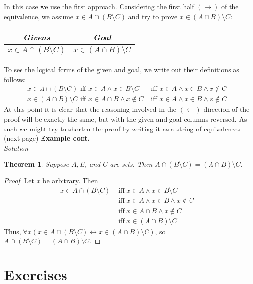 \documentclass{report}
\newtheorem*{theorem}{Theorem}
\theoremstyle{definition}
\begin{document}
In this case we use the first approach. Considering the first half $(\rightarrow)$ of the equivalence, we assume $x\in A\cap(B\setminus C)$
and try to prove $x\in(A\cap B)\setminus C$:
\begin{center}
\begin{tabular}{c|c}
\textit{Givens}&\textit{Goal}\\
\hline
$x\in A\cap(B\setminus C)$&$x\in(A\cap B)\setminus C$\\
\end{tabular}
\end{center}
To see the logical forms of the given and goal, we write out their definitions as follows:
\begin{align*}
x\in A\cap(B\setminus C)\text{ iff }x\in A\land x\in B\setminus C&\text{ iff }x\in A\land x\in B\land x\notin C\\
x\in(A\cap B)\setminus C\text{ iff }x\in A\cap B\land x\notin C&\text{ iff }x\in A\land x\in B\land x\notin C
\end{align*}
At this point it is clear that the reasoning involved in the $(\leftarrow)$ direction of the proof will be exactly the same, but with the given and goal columns reversed. 
As such we might try to shorten the proof by writing it as a string of equivalences.\\
(next page)\newpage
\noindent\textbf{Example cont.}\\
\textit{Solution}
\begin{theorem}
Suppose $A,B$, and $C$ are sets. Then $A\cap(B\setminus C)=(A\cap B)\setminus C$.
\end{theorem}
\begin{proof}
Let $x$ be arbitrary. Then
\begin{align*}
x\in A\cap(B\setminus C)&\text{ iff }x\in A\land x\in B\setminus C\\
&\text{ iff }x\in A\land x\in B\land x\notin C\\
&\text{ iff }x\in A\cap B\land x\notin C\\
&\text{ iff }x\in(A\cap B)\setminus C
\end{align*}
Thus, $\forall x(x\in A\cap(B\setminus C)\leftrightarrow x\in(A\cap B)\setminus C)$, so $A\cap(B\setminus C)=(A\cap B)\setminus C$.
\end{proof}







\appendix
\chapter{Exercises}
\end{document}
